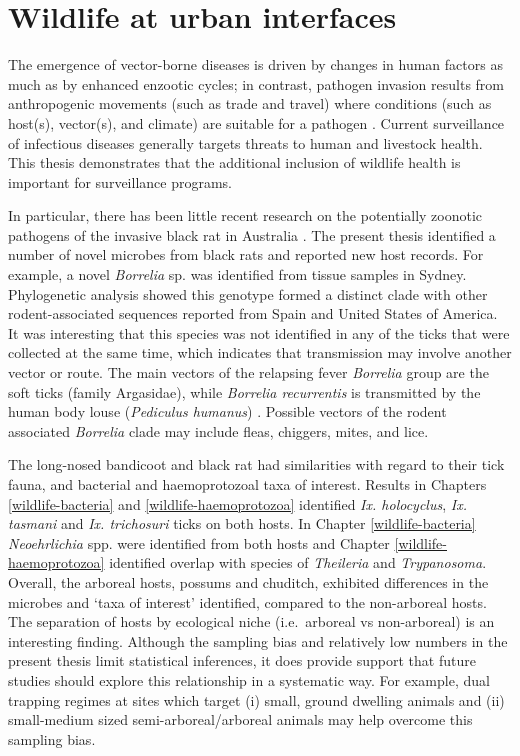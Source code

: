 \documentclass[a4paper, nobind]{templates/ociamthesis}
\begin{document}
\hypertarget{wildlife-at-urban-interfaces}{%
\section{Wildlife at urban interfaces}\label{wildlife-at-urban-interfaces}}

The emergence of vector-borne diseases is driven by changes in human factors as much as by enhanced enzootic cycles; in contrast, pathogen invasion results from anthropogenic movements (such as trade and travel) where conditions (such as host(s), vector(s), and climate) are suitable for a pathogen \autocite{kilpatrickDriversDynamicsControl2012}.
Current surveillance of infectious diseases generally targets threats to human and livestock health.
This thesis demonstrates that the additional inclusion of wildlife health is important for surveillance programs.

In particular, there has been little recent research on the potentially zoonotic pathogens of the invasive black rat in Australia \autocite{banksReviewEvidencePotential2012}.
The present thesis identified a number of novel microbes from black rats and reported new host records.
For example, a novel \emph{Borrelia} sp. was identified from tissue samples in Sydney.
Phylogenetic analysis showed this genotype formed a distinct clade with other rodent-associated sequences reported from Spain and United States of America.
It was interesting that this species was not identified in any of the ticks that were collected at the same time, which indicates that transmission may involve another vector or route.
The main vectors of the relapsing fever \emph{Borrelia} group are the soft ticks (family Argasidae), while \emph{Borrelia recurrentis} is transmitted by the human body louse (\emph{Pediculus humanus}) \autocite{gilIdentificationNewBorrelia2005}.
Possible vectors of the rodent associated \emph{Borrelia} clade may include fleas, chiggers, mites, and lice.

The long-nosed bandicoot and black rat had similarities with regard to their tick fauna, and bacterial and haemoprotozoal taxa of interest.
Results in Chapters \ref{wildlife-bacteria} and \ref{wildlife-haemoprotozoa} identified \emph{Ix. holocyclus}, \emph{Ix. tasmani} and \emph{Ix. trichosuri} ticks on both hosts.
In Chapter \ref{wildlife-bacteria} \emph{Neoehrlichia} spp. were identified from both hosts and Chapter \ref{wildlife-haemoprotozoa} identified overlap with species of \emph{Theileria} and \emph{Trypanosoma}.
Overall, the arboreal hosts, possums and chuditch, exhibited differences in the microbes and `taxa of interest' identified, compared to the non-arboreal hosts.
The separation of hosts by ecological niche (i.e.~arboreal vs non-arboreal) is an interesting finding.
Although the sampling bias and relatively low numbers in the present thesis limit statistical inferences, it does provide support that future studies should explore this relationship in a systematic way.
For example, dual trapping regimes at sites which target (i) small, ground dwelling animals and (ii) small-medium sized semi-arboreal/arboreal animals may help overcome this sampling bias.
\end{document}
